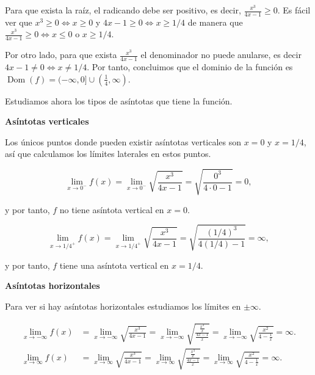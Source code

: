\documentclass[
  spanish,
  a4paper,
]{scrreport}
\theoremstyle{definition}
\theoremstyle{remark}
\begin{document}
\begin{tcolorbox}[enhanced jigsaw, arc=.35mm, bottomrule=.15mm, bottomtitle=1mm, breakable, colback=white, colbacktitle=quarto-callout-tip-color!10!white, colframe=quarto-callout-tip-color-frame, coltitle=black, left=2mm, leftrule=.75mm, opacityback=0, opacitybacktitle=0.6, rightrule=.15mm, title=\textcolor{quarto-callout-tip-color}{\faLightbulb}\hspace{0.5em}{Solución}, titlerule=0mm, toprule=.15mm, toptitle=1mm]

Para que exista la raíz, el radicando debe ser positivo, es decir,
\(\frac{x^3}{4x-1}\geq 0\). Es fácil ver que
\(x^3\geq 0\Leftrightarrow x\geq 0\) y
\(4x-1\geq 0\Leftrightarrow x\geq 1/4\) de manera que
\(\frac{x^3}{4x-1}\geq 0\Leftrightarrow x\leq 0 \mbox{ o } x\geq 1/4\).

Por otro lado, para que exista \(\frac{x^3}{4x-1}\) el denominador no
puede anularse, es decir \(4x-1\neq 0 \Leftrightarrow x\neq 1/4\). Por
tanto, concluimos que el dominio de la función es
\(\operatorname{Dom}(f)=(-\infty, 0]\cup (\frac{1}{4},\infty)\).

Estudiamos ahora los tipos de asíntotas que tiene la función.

\textbf{Asíntotas verticales}

Los únicos puntos donde pueden existir asíntotas verticales son \(x=0\)
y \(x=1/4\), así que calculamos los límites laterales en estos puntos.

\[
\lim_{x\to 0^-}f(x) = \lim_{x\to 0^-} \sqrt{\frac{x^3}{4x-1}} = \sqrt{\frac{0^3}{4\cdot 0-1}} = 0,
\]

y por tanto, \(f\) no tiene asíntota vertical en \(x=0\).

\[
\lim_{x\to 1/4^+}f(x) = \lim_{x\to 1/4^+} \sqrt{\frac{x^3}{4x-1}} = \sqrt{\frac{(1/4)^3}{4(1/4)-1}} = \infty,
\]

y por tanto, \(f\) tiene una asíntota vertical en \(x=1/4\).

\textbf{Asíntotas horizontales}

Para ver si hay asíntotas horizontales estudiamos los límites en
\(\pm \infty\).

\begin{align*}
\lim_{x\to-\infty}f(x) &=  \lim_{x\to-\infty} \sqrt{\frac{x^3}{4x-1}} = \lim_{x\to-\infty} \sqrt{\frac{\frac{x^3}{x}}{\frac{4x-1}{x}}} = \lim_{x\to-\infty} \sqrt{\frac{x^2}{4-\frac{1}{x}}} = \infty.\\
\lim_{x\to\infty}f(x) &=  \lim_{x\to\infty} \sqrt{\frac{x^3}{4x-1}} = \lim_{x\to\infty} \sqrt{\frac{\frac{x^3}{x}}{\frac{4x-1}{x}}} = \lim_{x\to\infty} \sqrt{\frac{x^2}{4-\frac{1}{x}}} = \infty.
\end{align*}


\end{tcolorbox}
\end{document}

